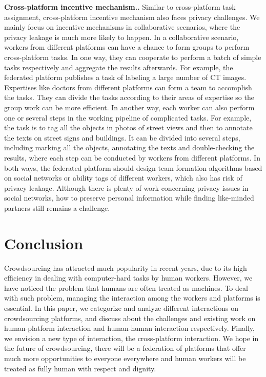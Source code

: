 \documentclass[11pt]{article}
\newcommand{\fakeparagraph}[1]{\vspace{1mm}\noindent\textbf{#1.}}
\begin{document}
\fakeparagraph{Cross-platform incentive mechanism.}
Similar to cross-platform task assignment, cross-platform incentive mechanism also faces privacy challenges.
We mainly focus on incentive mechanisms in collaborative scenarios, where the privacy leakage is much more likely to happen.
In a collaborative scenario, workers from different platforms can have a chance to form groups to perform cross-platform tasks.
In one way, they can cooperate to perform a batch of simple tasks respectively and aggregate the results afterwards.
For example, the federated platform publishes a task of labeling a large number of CT images.
Expertises like doctors from different platforms can form a team to accomplish the tasks.
They can divide the tasks according to their areas of expertise so the group work can be more efficient. 
In another way, each worker can also perform one or several steps in the working pipeline of complicated tasks.
For example, the task is to tag all the objects in photos of street views and then to annotate the texts on street signs and buildings.
It can be divided into several steps, including marking all the objects, annotating the texts and double-checking the results, where each step can be conducted by workers from different platforms.
In both ways, the federated platform should design team formation algorithms based on social networks or ability tags of different workers, which also has risk of privacy leakage.
Although there is plenty of work concerning privacy issues in social networks, how to preserve personal information while finding like-minded partners still remains a challenge. 

\section{Conclusion}
Crowdsourcing has attracted much popularity in recent years, due to its high efficiency in dealing with computer-hard tasks by human workers.
However, we have noticed the problem that humans are often treated as machines.
To deal with such problem, managing the interaction among the workers and platforms is essential.
In this paper, we categorize and analyze different interactions on crowdsourcing platforms, and discuss about the challenges and existing work on human-platform interaction and human-human interaction respectively.
Finally, we envision a new type of interaction, the cross-platform interaction. 
We hope in the future of crowdsourcing, there will be a federation of platforms that offer much more opportunities to everyone everywhere and human workers will be treated as fully human with respect and dignity.




\end{document}
